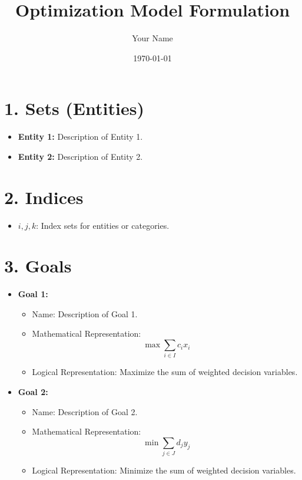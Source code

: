 \documentclass{article}
\title{Optimization Model Formulation}
\author{Your Name}
\date{\today}
\begin{document}
\maketitle

\tableofcontents
\newpage

\section{1. Sets (Entities)}
\begin{itemize}
    \item \textbf{Entity 1:} Description of Entity 1.
    \item \textbf{Entity 2:} Description of Entity 2.
\end{itemize}

\section{2. Indices}
\begin{itemize}
    \item \( i, j, k \): Index sets for entities or categories.
\end{itemize}

\section{3. Goals}
\begin{itemize}
    \item \textbf{Goal 1:} 
        \begin{itemize}
            \item Name: Description of Goal 1.
            \item Mathematical Representation:
                \[
                    \max \sum_{i \in I} c_i x_i
                \]
            \item Logical Representation: Maximize the sum of weighted decision variables.
        \end{itemize}

    \item \textbf{Goal 2:}
        \begin{itemize}
            \item Name: Description of Goal 2.
            \item Mathematical Representation:
                \[
                    \min \sum_{j \in J} d_j y_j
                \]
            \item Logical Representation: Minimize the sum of weighted decision variables.
        \end{itemize}
\end{itemize}
\end{document}
